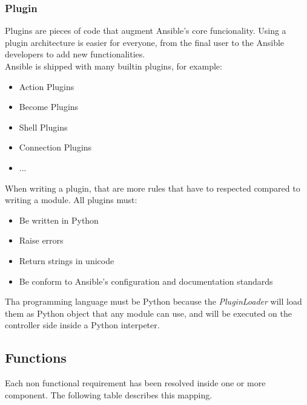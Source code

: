 \documentclass[conference]{IEEEtran}
\begin{document}
\subsubsection{Plugin}
Plugins are pieces of code that augment Ansible's core funcionality. Using a plugin architecture is easier for everyone, from the final user to the Ansible developers to add new functionalities.\\
Ansible is shipped with many builtin plugins, for example:
\begin{itemize}
    \item Action Plugins
    \item Become Plugins
    \item Shell Plugins
    \item Connection Plugins
    \item ...
\end{itemize}
When writing a plugin, that are more rules that have to respected compared to writing a module. All plugins must:
\begin{itemize}
    \item Be written in Python
    \item Raise errors
    \item Return strings in unicode 
    \item Be conform to Ansible's configuration and documentation standards
\end{itemize}
Tha programming language must be Python because the \textit{PluginLoader} will load them as Python object that any module can use, and will be executed on the controller side inside a Python interpeter.\\
\newpage

\subsection{Functions}
Each non functional requirement has been resolved inside one or more component. The following table describes this mapping.\\
\end{document}
